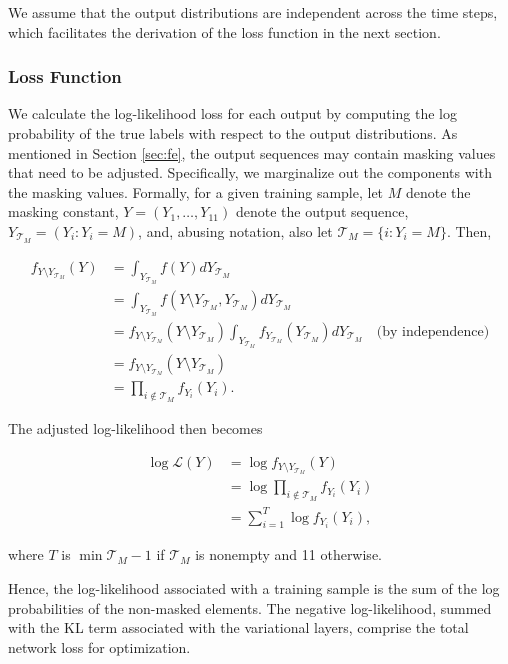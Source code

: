 \documentclass{article}
\begin{document}
We assume that the output distributions are independent across the time steps, which facilitates the derivation of the loss function in the next section.

\subsubsection{Loss Function}\label{sec:loss-function}

We calculate the log-likelihood loss for each output by computing the log probability of the true labels with respect to the output distributions. As mentioned in Section \ref{sec:fe}, the output sequences may contain masking values that need to be adjusted. Specifically, we marginalize out the components with the masking values. Formally, for a given training sample, let $M$ denote the masking constant, $Y=(Y_1,\dots,Y_{11})$ denote the output sequence, $Y_{\mathcal{T}_M} = (Y_i: Y_i = M)$, and, abusing notation, also let $\mathcal{T}_M = \{i: Y_i = M\}$. Then,

\begin{align}
    f_{Y\setminus Y_{\mathcal{T}_M}}(Y) &= \int_{Y_{\mathcal{T}_M}} f(Y) dY_{\mathcal{T}_M}\\
         &= \int_{Y_{\mathcal{T}_M}} f(Y\setminus Y_{\mathcal{T}_M}, Y_{\mathcal{T}_M}) dY_{\mathcal{T}_M}\\
         &= f_{Y\setminus Y_{\mathcal{T}_M}}(Y\setminus Y_{\mathcal{T}_M}) \int_{Y_{\mathcal{T}_M}} f_{Y_{\mathcal{T}_M}}(Y_{\mathcal{T}_M}) dY_{\mathcal{T}_M} \quad \text{(by independence)}\\
         &= f_{Y\setminus Y_{\mathcal{T}_M}}(Y\setminus Y_{\mathcal{T}_M})\\
         &= \prod_{i \notin \mathcal{T}_M} f_{Y_i}(Y_i).
\end{align}

The adjusted log-likelihood then becomes

\begin{align}
    \log\mathcal{L}(Y) &= \log  f_{Y\setminus Y_{\mathcal{T}_M}}(Y)\\
                       &= \log \prod_{i \notin \mathcal{T}_M} f_{Y_i}(Y_i)\\
                       &= \sum_{i = 1}^{T}\log f_{Y_i}(Y_i),
\end{align}

where $T$ is $\min \mathcal{T}_M - 1$ if $\mathcal{T}_M$ is nonempty and 11 otherwise.

Hence, the log-likelihood associated with a training sample is the sum of the log probabilities of the non-masked elements. The negative log-likelihood, summed with the KL term associated with the variational layers, comprise the total network loss for optimization.
\end{document}
